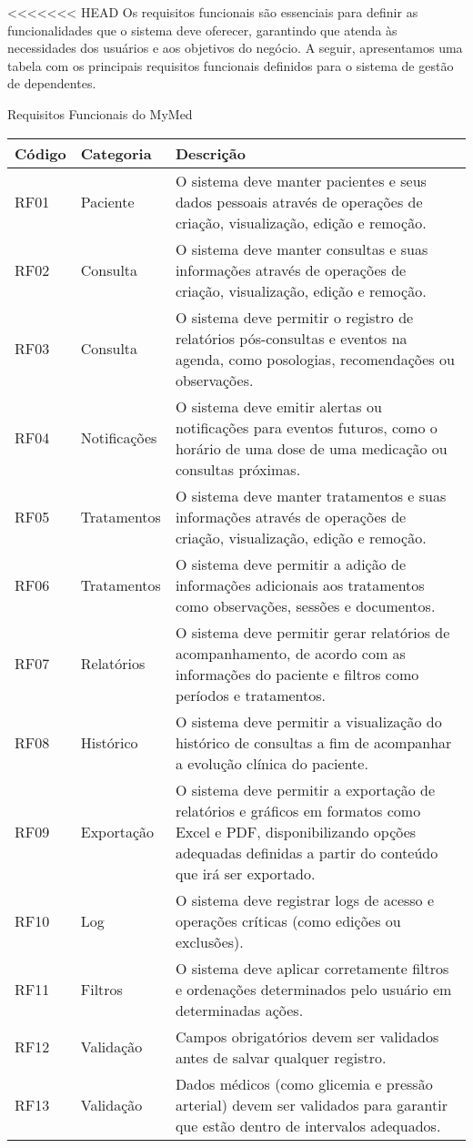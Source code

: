 <<<<<<< HEAD
Os requisitos funcionais são essenciais para definir as funcionalidades que o sistema deve oferecer, garantindo que atenda às necessidades dos usuários e aos objetivos do negócio. A seguir, apresentamos uma tabela com os principais requisitos funcionais definidos para o sistema de gestão de dependentes.

\begin{quadro}
\caption{Requisitos Funcionais do MyMed}
\begin{tabularx}{\textwidth}{|l|l|X|}
\hline
\textbf{Código} & \textbf{Categoria} & \textbf{Descrição} \\ \hline
RF01 & Paciente & O sistema deve manter pacientes e seus dados pessoais através de operações de criação, visualização, edição e remoção. \\ \hline
RF02 & Consulta & O sistema deve manter consultas e suas informações através de operações de criação, visualização, edição e remoção. \\ \hline
RF03 & Consulta & O sistema deve permitir o registro de relatórios pós-consultas e eventos na agenda, como posologias, recomendações ou observações. \\ \hline
RF04 & Notificações & O sistema deve emitir alertas ou notificações para eventos futuros, como o horário de uma dose de uma medicação ou consultas próximas. \\ \hline
RF05 & Tratamentos & O sistema deve manter tratamentos e suas informações através de operações de criação, visualização, edição e remoção. \\ \hline
RF06 & Tratamentos & O sistema deve permitir a adição de informações adicionais aos tratamentos como observações, sessões e documentos. \\ \hline
RF07 & Relatórios & O sistema deve permitir gerar relatórios de acompanhamento, de acordo com as informações do paciente e filtros como períodos e tratamentos. \\ \hline
RF08 & Histórico & O sistema deve permitir a visualização do histórico de consultas a fim de acompanhar a evolução clínica do paciente. \\ \hline
RF09 & Exportação & O sistema deve permitir a exportação de relatórios e gráficos em formatos como Excel e PDF, disponibilizando opções adequadas definidas a partir do conteúdo que irá ser exportado. \\ \hline
RF10 & Log & O sistema deve registrar logs de acesso e operações críticas (como edições ou exclusões). \\ \hline
RF11 & Filtros & O sistema deve aplicar corretamente filtros e ordenações determinados pelo usuário em determinadas ações. \\ \hline
RF12 & Validação & Campos obrigatórios devem ser validados antes de salvar qualquer registro. \\ \hline
RF13 & Validação & Dados médicos (como glicemia e pressão arterial) devem ser validados para garantir que estão dentro de intervalos adequados. \\ \hline
\end{tabularx}
\end{quadro}
